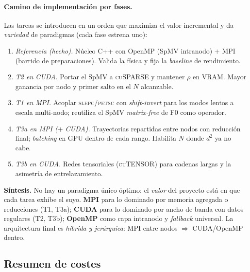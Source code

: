 \documentclass[11pt,a4paper]{article}
\theoremstyle{definition}
\theoremstyle{plain}
\begin{document}
\paragraph{Camino de implementación por fases.}
Las tareas se introducen en un orden que maximiza el valor incremental y da
\emph{variedad} de paradigmas (cada fase estrena uno):
\begin{enumerate}[leftmargin=1.8em,itemsep=2pt]
\item[\textbf{F0}] \emph{Referencia (hecho).} Núcleo C++ con OpenMP (SpMV
intranodo) ${+}$ MPI (barrido de preparaciones). Valida la física y fija la
\emph{baseline} de rendimiento.
\item[\textbf{F1}] \emph{T2 en CUDA.} Portar el SpMV a \textsc{cuSPARSE} y mantener
$\rho$ en VRAM. Mayor ganancia por nodo y primer salto en el $N$ alcanzable.
\item[\textbf{F2}] \emph{T1 en MPI.} Acoplar \textsc{slepc/petsc} con
\emph{shift-invert} para los modos lentos a escala multi-nodo; reutiliza el SpMV
\emph{matrix-free} de F0 como operador.
\item[\textbf{F3}] \emph{T3a en MPI (${+}$ CUDA).} Trayectorias repartidas entre
nodos con reducción final; \emph{batching} en GPU dentro de cada rango. Habilita
$N$ donde $d^2$ ya no cabe.
\item[\textbf{F4}] \emph{T3b en CUDA.} Redes tensoriales (\textsc{cuTENSOR}) para
cadenas largas y la asimetría de entrelazamiento.
\end{enumerate}

\begin{cajaclave}
\textbf{Síntesis.} No hay un paradigma único óptimo: el \emph{valor} del proyecto
está en que cada tarea exhibe el suyo. \textbf{MPI} para lo dominado por memoria
agregada o reducciones (T1, T3a); \textbf{CUDA} para lo dominado por ancho de
banda con datos regulares (T2, T3b); \textbf{OpenMP} como capa intranodo y
\emph{fallback} universal. La arquitectura final es \emph{híbrida y jerárquica}:
MPI entre nodos $\Rightarrow$ CUDA/OpenMP dentro.
\end{cajaclave}

\subsection{Resumen de costes}
\end{document}
